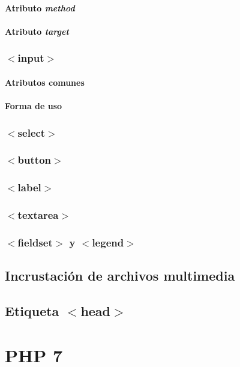 \documentclass[12pt]{report}
\begin{document}
				\paragraph{Atributo \textit{method}}
				\paragraph{Atributo \textit{target}}
			\subsubsection{$<$input$>$}
				\paragraph{Atributos comunes}
				\paragraph{Forma de uso}
			\subsubsection{$<$select$>$}
			\subsubsection{$<$button$>$}
			\subsubsection{$<$label$>$}
			\subsubsection{$<$textarea$>$}
			\subsubsection{$<$fieldset$>$ y $<$legend$>$}
		\subsection{Incrustación de archivos multimedia}
		\subsection{Etiqueta $<$head$>$}
	\section{PHP 7}
\end{document}
